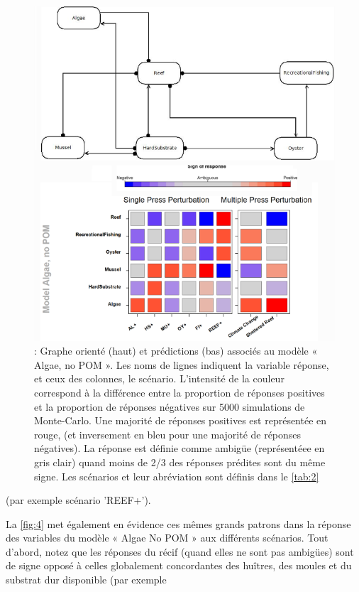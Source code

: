 \documentclass[12pt]{report}
\begin{document}
\begin{figure}
    \centering
    \includegraphics[width = \linewidth]{prop_rep_quali_plusdia.jpg}
    \caption[Topologie du modèle sélectionné et matrice adjointe associée]{: Graphe orienté (haut) et prédictions (bas) associés au modèle « Algae, no POM ». Les noms de lignes indiquent la variable réponse, et ceux des colonnes, le scénario. L’intensité de la couleur correspond à la différence entre la proportion de réponses positives et la proportion de réponses  négatives  sur 5000 simulations de Monte-Carlo. Une majorité de réponses positives est représentée en rouge, (et inversement en bleu pour une majorité de réponses négatives). La réponse est définie comme ambigüe (représentéee en gris clair) quand moins de 2/3 des réponses prédites sont du même signe. Les scénarios et leur abréviation sont définis dans le \autoref{tab:2}}
    \label{fig:4}
    \vspace{-5mm}
\end{figure}
(par exemple scénario 'REEF+').

La \autoref{fig:4} met également en évidence ces mêmes grands patrons dans la réponse des variables du modèle « Algae No POM » aux différents scénarios. Tout d'abord, notez que les réponses du récif (quand elles ne sont pas ambigües) sont de signe opposé à celles globalement concordantes des huîtres, des moules et du substrat dur disponible (par exemple
\end{document}
